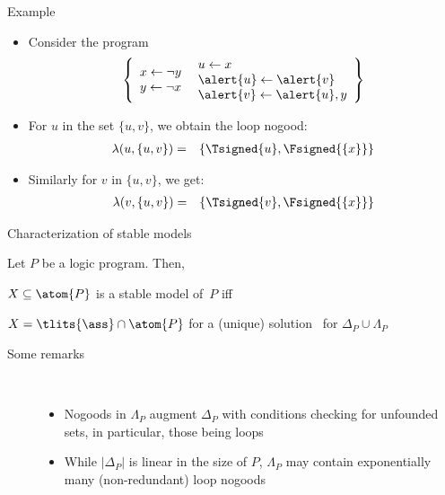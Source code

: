 \begin{frame}{Example}
  \begin{itemize}
  \item<1-> Consider the program
    \[
    \left\{
      \begin{array}{l}
        x  \leftarrow  \neg y\\
        y  \leftarrow  \neg x
      \end{array}
      \
      \begin{array}{l}
        u  \leftarrow  x\\
        \alert{u}  \leftarrow  \alert{v}\\
        \alert{v}  \leftarrow  \alert{u}, y
      \end{array}
    \right\}
    \]
  \item<2-> For $u$ in the set $\{u,v\}$, we obtain the loop nogood:
    \begin{eqnarray*}
      \lambda(u,\{u,v\}) &=& \{\Tsigned{u},\Fsigned{\{x\}}\}
    \end{eqnarray*}
  \item<3-> [] Similarly for $v$ in $\{u,v\}$, we get:
    \begin{eqnarray*}
      \lambda(v,\{u,v\}) &=& \{\Tsigned{v},\Fsigned{\{x\}}\}
    \end{eqnarray*}
  \end{itemize}
\end{frame}
\begin{frame}{Characterization of stable models}
\bigskip
\begin{theorem}
Let $P$ be a logic program. Then,

\qquad $X\subseteq\atom{P}$ is a stable model of~$P$ \alert{iff}

\qquad $X=\tlits{\ass}\cap\atom{P}$ for a (unique)
solution \ass\ for $\Delta_P\cup\Lambda_P$
\end{theorem}
\bigskip
\pause
\begin{description}
\item [Some remarks] \
\begin{itemize}
\item
Nogoods in $\Lambda_P$ augment $\Delta_P$
with conditions checking for \alert{unfounded sets},
in particular,
those being loops
\item
While $|\Delta_P|$ is linear in the size of $P$,
$\Lambda_P$ may contain \alert{exponentially many} (non-redundant) loop nogoods
\end{itemize}
\end{description}
\end{frame}
%
